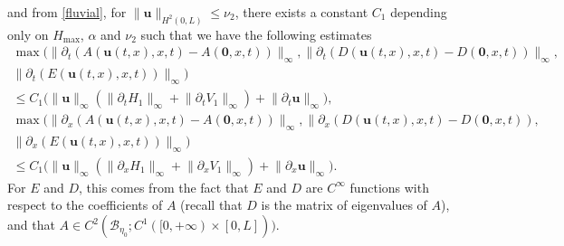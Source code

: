 \documentclass[JEP,XML,SOM,Unicode]{cedram}
\let\mathcal\mathscr
\theoremstyle{definition}
\begin{document}
and from \eqref{fluvial},
for $\lVert\boldsymbol{u}\rVert_{H^{2}(0,L)}\leq \nu_{2}$, there exists a constant $C_{1}$ depending only on $H_{\max}$, $\alpha$ and $\nu_{2}$ such that we have the following estimates
\begin{equation}
\label{ineq}
\begin{split}
\max\bigl(\lVert \partial_{t}(A(\boldsymbol{u}(t,x),x,t)-A(\boldsymbol{0},x,t))\rVert_{\infty},\lVert \partial_{t}(D(\boldsymbol{u}(t,x),x,t)-D(\boldsymbol{0},x,t))\rVert_{\infty},&\\
\lVert \partial_{t}(E(\boldsymbol{u}(t,x),x,t))\rVert_{\infty}\bigr)&\\
\leq C_{1}\bigl(\lVert\boldsymbol{u}\rVert_{\infty}(\lVert\partial_{t}H_{1}\rVert_{\infty}+\lVert\partial_{t}V_{1}\rVert_{\infty})+\lVert\partial_{t}\boldsymbol{u}\rVert_{\infty}\bigr),&\\
\max\bigl(\lVert \partial_{{x}}(A(\boldsymbol{u}(t,x),x,t)-A(\boldsymbol{0},x,t))\rVert_{\infty},\lVert \partial_{{x}}(D(\boldsymbol{u}(t,x),x,t)-D(\boldsymbol{0},x,t)),&\\
\lVert \partial_{{x}}(E(\boldsymbol{u}(t,x),x,t))\rVert_{\infty}\bigr)&\\
\leq C_{1} \bigl(\lVert\boldsymbol{u}\rVert_{\infty}(\lVert\partial_{x}H_{1}\rVert_{\infty}+\lVert\partial_{x}V_{1}\rVert_{\infty})+\lVert\partial_{x}\boldsymbol{u}\rVert_{\infty} \bigr).&
\end{split}
\end{equation}
For $E$ and $D$, this comes from the fact that $E$ and $D$ are $C^{\infty}$ functions with respect to the coefficients of $A$ ({recall} that $D$ is the matrix of eigenvalues of $A$), and that $A\in C^{2}(\mathcal{B}_{\eta_{0}}; C^{1}([0,+\infty)\times[0,L]))$.
\end{document}
